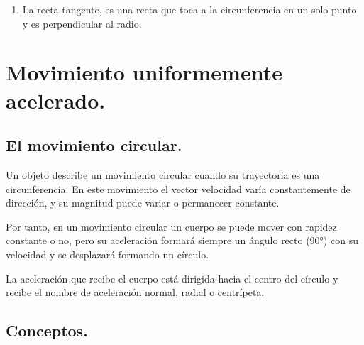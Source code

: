 \documentclass[12pt]{article}
\begin{document}
\begin{enumerate}
\begin{figure}[H]
\end{figure}
\item La recta tangente, es una recta que toca a la circunferencia en un solo punto y es perpendicular al radio.
\begin{figure}[H]
    \centering
\end{figure}
\end{enumerate}

\section{Movimiento uniformemente acelerado.}

\subsection{El movimiento circular.}

Un objeto describe un movimiento circular cuando su trayectoria es una circunferencia. En este movimiento el vector velocidad varía constantemente de dirección, y su magnitud puede variar o permanecer constante.

Por tanto, en un movimiento circular un cuerpo se puede mover con rapidez constante o no, pero su aceleración formará siempre un ángulo recto (\ang{90}) con su velocidad y se desplazará formando un círculo.
    
La aceleración que recibe el cuerpo está dirigida hacia el centro del círculo y recibe el nombre de aceleración normal, radial o centrípeta.

\subsection{Conceptos.}
\end{document}
